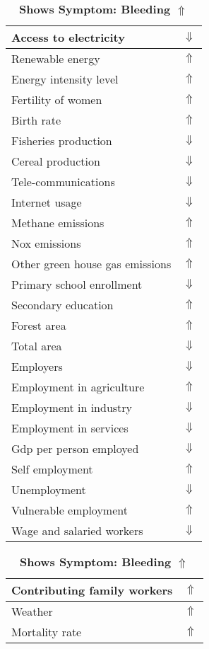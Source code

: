 \documentclass[12pt,notitlepage,oneside]{report}
\begin{document}
\begin{table}[!htb]
\caption{\textbf{Shows Symptom: Bleeding $\Uparrow$}}
\centering
\label{Correlated Socio-economic Factors0}
\begin{tabular}{|l|l|}
\hline
Access to electricity & $\Downarrow$\\ \hline
Renewable energy & $\Uparrow$\\ \hline
Energy intensity level & $\Uparrow$\\ \hline
Fertility of women & $\Uparrow$\\ \hline
Birth rate & $\Uparrow$\\ \hline
Fisheries production & $\Downarrow$\\ \hline
Cereal production & $\Downarrow$\\ \hline
Tele-communications & $\Downarrow$\\ \hline
Internet usage & $\Downarrow$\\ \hline
Methane emissions & $\Uparrow$\\ \hline
Nox emissions & $\Uparrow$\\ \hline
Other green house gas emissions & $\Uparrow$\\ \hline
Primary school enrollment & $\Downarrow$\\ \hline
Secondary education & $\Uparrow$\\ \hline
Forest area & $\Uparrow$\\ \hline
Total area & $\Downarrow$\\ \hline
Employers & $\Downarrow$\\ \hline
Employment in agriculture & $\Uparrow$\\ \hline
Employment in industry & $\Downarrow$\\ \hline
Employment in services & $\Downarrow$\\ \hline
Gdp per person employed & $\Downarrow$\\ \hline
Self employment & $\Uparrow$\\ \hline
Unemployment & $\Downarrow$\\ \hline
Vulnerable employment & $\Uparrow$\\ \hline
Wage and salaried workers & $\Downarrow$\\ \hline
\end{tabular}
\begin{tabular}{|l|l|}
\hline
Contributing family workers & $\Uparrow$\\ \hline
Weather & $\Uparrow$\\ \hline
Mortality rate & $\Uparrow$\\ \hline

\end{tabular}
\end{table}
\end{document}
